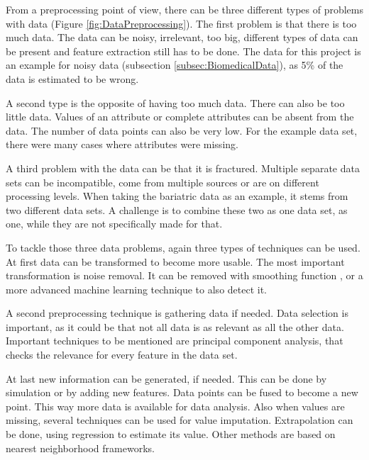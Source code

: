 \documentclass[10pt,a4paper]{article}
\begin{document}
 	From a preprocessing point of view, there can be three different types of problems with data (Figure \ref{fig:DataPreprocessing}). The first problem is that there is too much data. The data can be noisy, irrelevant, too big, different types of data can be present and feature extraction still has to be done. The data for this project is an example for noisy data (subsection \ref{subsec:BiomedicalData}), as 5\% of the data is estimated to be wrong.
 	
 	A second type is the opposite of having too much data. There can also be too little data. Values of an attribute or complete attributes can be absent from the data. The number of data points can also be very low. For the example data set, there were many cases where attributes were missing.
 	
	A third problem with the data can be that it is fractured. Multiple separate data sets can be incompatible, come from multiple sources or are on different processing levels. When taking the bariatric data as an example, it stems from two different data sets. A challenge is to combine these two as one data set, as one, while they are not specifically made for that.
 	
	To tackle those three data problems, again three types of techniques can be used. At first data can be transformed to become more usable. The most important transformation is noise removal. It can be removed with smoothing function \cite{somorjai2004data, karagiannis2011noise}, or a more advanced machine learning technique to also detect it. \cite{gamberger2000noise}
 	
 	A second preprocessing technique is gathering data if needed. Data selection is important, as it could be that not all data is as relevant as all the other data. Important techniques to be mentioned are principal component analysis, that checks the relevance for every feature in the data set. \cite{duszak1994using} 
 	
 	At last new information can be generated, if needed. This can be done by simulation or by adding new features. Data points can be fused to become a new point. This way more data is available for data analysis. Also when values are missing, several techniques can be used for value imputation. Extrapolation can be done, using regression to estimate its value. Other methods are based on nearest neighborhood frameworks. \cite{zhu2011missing} 
 	
\end{document}
